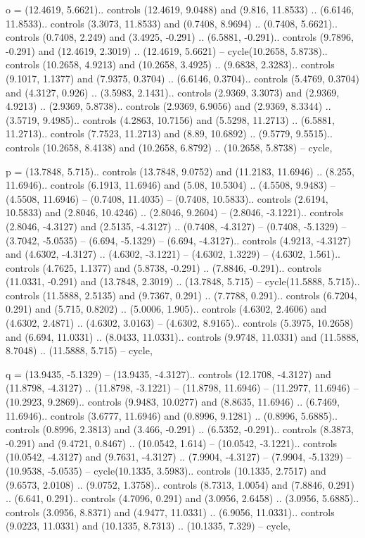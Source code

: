 o = {(12.4619, 5.6621).. controls (12.4619, 9.0488) and (9.816, 11.8533) .. (6.6146, 11.8533).. controls (3.3073, 11.8533) and (0.7408, 8.9694) .. (0.7408, 5.6621).. controls (0.7408, 2.249) and (3.4925, -0.291) .. (6.5881, -0.291).. controls (9.7896, -0.291) and (12.4619, 2.3019) .. (12.4619, 5.6621) -- cycle(10.2658, 5.8738).. controls (10.2658, 4.9213) and (10.2658, 3.4925) .. (9.6838, 2.3283).. controls (9.1017, 1.1377) and (7.9375, 0.3704) .. (6.6146, 0.3704).. controls (5.4769, 0.3704) and (4.3127, 0.926) .. (3.5983, 2.1431).. controls (2.9369, 3.3073) and (2.9369, 4.9213) .. (2.9369, 5.8738).. controls (2.9369, 6.9056) and (2.9369, 8.3344) .. (3.5719, 9.4985).. controls (4.2863, 10.7156) and (5.5298, 11.2713) .. (6.5881, 11.2713).. controls (7.7523, 11.2713) and (8.89, 10.6892) .. (9.5779, 9.5515).. controls (10.2658, 8.4138) and (10.2658, 6.8792) .. (10.2658, 5.8738) -- cycle},

p = {(13.7848, 5.715).. controls (13.7848, 9.0752) and (11.2183, 11.6946) .. (8.255, 11.6946).. controls (6.1913, 11.6946) and (5.08, 10.5304) .. (4.5508, 9.9483) -- (4.5508, 11.6946) -- (0.7408, 11.4035) -- (0.7408, 10.5833).. controls (2.6194, 10.5833) and (2.8046, 10.4246) .. (2.8046, 9.2604) -- (2.8046, -3.1221).. controls (2.8046, -4.3127) and (2.5135, -4.3127) .. (0.7408, -4.3127) -- (0.7408, -5.1329) -- (3.7042, -5.0535) -- (6.694, -5.1329) -- (6.694, -4.3127).. controls (4.9213, -4.3127) and (4.6302, -4.3127) .. (4.6302, -3.1221) -- (4.6302, 1.3229) -- (4.6302, 1.561).. controls (4.7625, 1.1377) and (5.8738, -0.291) .. (7.8846, -0.291).. controls (11.0331, -0.291) and (13.7848, 2.3019) .. (13.7848, 5.715) -- cycle(11.5888, 5.715).. controls (11.5888, 2.5135) and (9.7367, 0.291) .. (7.7788, 0.291).. controls (6.7204, 0.291) and (5.715, 0.8202) .. (5.0006, 1.905).. controls (4.6302, 2.4606) and (4.6302, 2.4871) .. (4.6302, 3.0163) -- (4.6302, 8.9165).. controls (5.3975, 10.2658) and (6.694, 11.0331) .. (8.0433, 11.0331).. controls (9.9748, 11.0331) and (11.5888, 8.7048) .. (11.5888, 5.715) -- cycle},

q = {(13.9435, -5.1329) -- (13.9435, -4.3127).. controls (12.1708, -4.3127) and (11.8798, -4.3127) .. (11.8798, -3.1221) -- (11.8798, 11.6946) -- (11.2977, 11.6946) -- (10.2923, 9.2869).. controls (9.9483, 10.0277) and (8.8635, 11.6946) .. (6.7469, 11.6946).. controls (3.6777, 11.6946) and (0.8996, 9.1281) .. (0.8996, 5.6885).. controls (0.8996, 2.3813) and (3.466, -0.291) .. (6.5352, -0.291).. controls (8.3873, -0.291) and (9.4721, 0.8467) .. (10.0542, 1.614) -- (10.0542, -3.1221).. controls (10.0542, -4.3127) and (9.7631, -4.3127) .. (7.9904, -4.3127) -- (7.9904, -5.1329) -- (10.9538, -5.0535) -- cycle(10.1335, 3.5983).. controls (10.1335, 2.7517) and (9.6573, 2.0108) .. (9.0752, 1.3758).. controls (8.7313, 1.0054) and (7.8846, 0.291) .. (6.641, 0.291).. controls (4.7096, 0.291) and (3.0956, 2.6458) .. (3.0956, 5.6885).. controls (3.0956, 8.8371) and (4.9477, 11.0331) .. (6.9056, 11.0331).. controls (9.0223, 11.0331) and (10.1335, 8.7313) .. (10.1335, 7.329) -- cycle},

